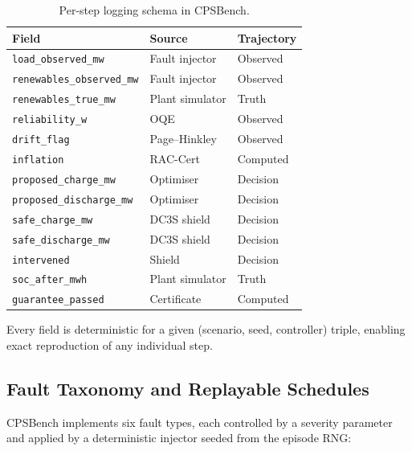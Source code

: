 \begin{table}[ht]
\centering
\caption{Per-step logging schema in CPSBench.}
\label{tab:cpsbench-log-schema}
\begin{tabular}{lll}
\toprule
\textbf{Field} & \textbf{Source} & \textbf{Trajectory} \\
\midrule
\texttt{load\_observed\_mw}    & Fault injector   & Observed \\
\texttt{renewables\_observed\_mw} & Fault injector & Observed \\
\texttt{renewables\_true\_mw}  & Plant simulator  & Truth \\
\texttt{reliability\_w}        & OQE              & Observed \\
\texttt{drift\_flag}           & Page--Hinkley    & Observed \\
\texttt{inflation}             & RAC-Cert         & Computed \\
\texttt{proposed\_charge\_mw}  & Optimiser        & Decision \\
\texttt{proposed\_discharge\_mw} & Optimiser      & Decision \\
\texttt{safe\_charge\_mw}      & DC3S shield      & Decision \\
\texttt{safe\_discharge\_mw}   & DC3S shield      & Decision \\
\texttt{intervened}            & Shield           & Decision \\
\texttt{soc\_after\_mwh}       & Plant simulator  & Truth \\
\texttt{guarantee\_passed}     & Certificate      & Computed \\
\bottomrule
\end{tabular}
\end{table}

Every field is deterministic for a given (scenario, seed, controller)
triple, enabling exact reproduction of any individual step.

\subsection{Fault Taxonomy and Replayable Schedules}

CPSBench implements six fault types, each controlled by a severity parameter
and applied by a deterministic injector seeded from the episode RNG:

